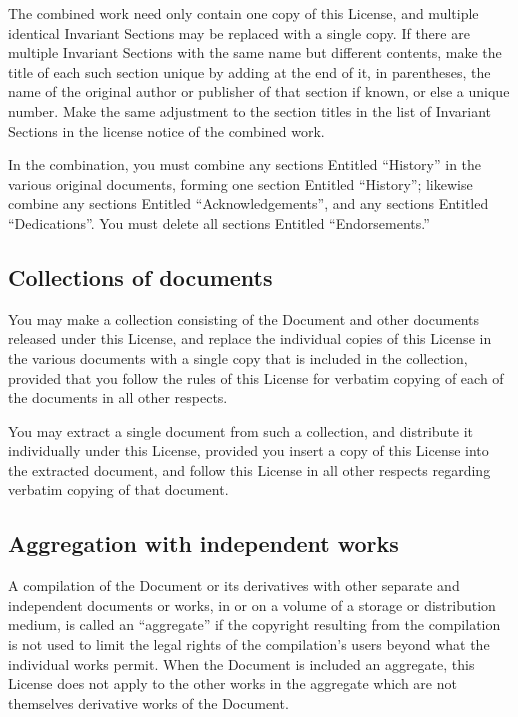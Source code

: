 {\tiny{}The combined work need only contain one copy of this License,
and multiple identical Invariant Sections may be replaced with a single
copy. If there are multiple Invariant Sections with the same name
but different contents, make the title of each such section unique
by adding at the end of it, in parentheses, the name of the original
author or publisher of that section if known, or else a unique number.
Make the same adjustment to the section titles in the list of Invariant
Sections in the license notice of the combined work.}{\tiny\par}

{\tiny{}In the combination, you must combine any sections Entitled
\textquotedblleft History\textquotedblright{} in the various original
documents, forming one section Entitled \textquotedblleft History\textquotedblright ;
likewise combine any sections Entitled \textquotedblleft Acknowledgements\textquotedblright ,
and any sections Entitled \textquotedblleft Dedications\textquotedblright .
You must delete all sections Entitled \textquotedblleft Endorsements.\textquotedblright{}}{\tiny\par}

\subsection*{{\tiny{}Collections of documents}}

{\tiny{}You may make a collection consisting of the Document and other
documents released under this License, and replace the individual
copies of this License in the various documents with a single copy
that is included in the collection, provided that you follow the rules
of this License for verbatim copying of each of the documents in all
other respects.}{\tiny\par}

{\tiny{}You may extract a single document from such a collection,
and distribute it individually under this License, provided you insert
a copy of this License into the extracted document, and follow this
License in all other respects regarding verbatim copying of that document.}{\tiny\par}

\subsection*{{\tiny{}Aggregation with independent works}}

{\tiny{}A compilation of the Document or its derivatives with other
separate and independent documents or works, in or on a volume of
a storage or distribution medium, is called an \textquotedblleft aggregate\textquotedblright{}
if the copyright resulting from the compilation is not used to limit
the legal rights of the compilation\textsf{'}s users beyond what the individual
works permit. When the Document is included an aggregate, this License
does not apply to the other works in the aggregate which are not themselves
derivative works of the Document.}{\tiny\par}


